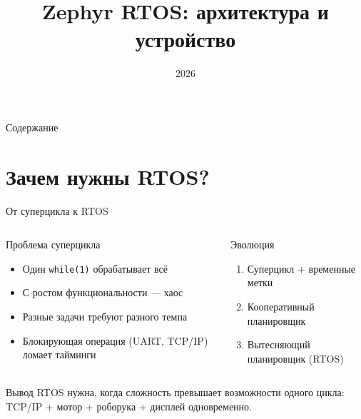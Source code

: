 \documentclass[12pt,aspectratio=169]{beamer}
\title{Zephyr RTOS: архитектура и устройство}
\date{2026}
\begin{document}
\frame{\titlepage}


\begin{frame}{Содержание}
\tableofcontents
\end{frame}


\section{Зачем нужны RTOS?}

\begin{frame}{От суперцикла к RTOS}
\begin{columns}
\begin{block}{Проблема суперцикла}
\begin{itemize}
  \item Один \texttt{while(1)} обрабатывает всё
  \item С ростом функциональности --- хаос
  \item Разные задачи требуют разного темпа
  \item Блокирующая операция (UART, TCP/IP) ломает тайминги
\end{itemize}
\end{block}
\begin{block}{Эволюция}
\begin{enumerate}
  \item Суперцикл + временные метки
  \item Кооперативный планировщик
  \item Вытесняющий планировщик (RTOS)
\end{enumerate}
\end{block}
\end{columns}

\vspace{6pt}
\begin{alertblock}{Вывод}
RTOS нужна, когда сложность превышает возможности одного цикла:
TCP/IP + мотор + роборука + дисплей одновременно.
\end{alertblock}
\end{frame}

\end{document}
